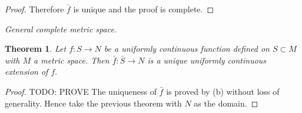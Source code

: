 \documentclass[letter]{article}
\newtheorem{theorem}{Theorem}
\newenvironment{menumerate}{%
  \edef\backupindent{\the\parindent}%
  \enumerate%
  \setlength{\parindent}{\backupindent}%
}{\endenumerate}
\begin{document}
\begin{menumerate}
\begin{menumerate}
\begin{proof}
						Therefore $\bar f$ is unique and the proof is complete.
					\end{proof}

				\item \emph{General complete metric space.}
					\begin{theorem}
						Let $f:S \to N$ be a uniformly continuous function defined on $S \subset M$ with $M$ a metric space. Then $\bar f: \bar S \to N$ is a unique uniformly continuous extension of $f.$
					\end{theorem}
					\begin{proof}
					
						TODO: PROVE
					The uniqueness of $\bar f$ is proved by (b) without loss of generality. Hence take the previous theorem with $N$ as the domain.
					\end{proof}
			\end{menumerate}

	\end{menumerate}
\end{document}
